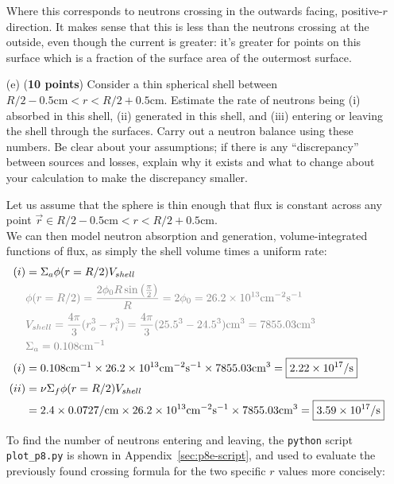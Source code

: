 \documentclass[11pt]{article}
\newcommand{\ans}[1]{{\color{violet}#1}}
\begin{document}
\begin{enumerate}
{    Where this corresponds to neutrons crossing in the outwards facing, positive-$r$ direction. It makes sense that this is less than the neutrons crossing at the outside, even though the current is greater: it's greater for points on this surface which is a fraction of the surface area of the outermost surface.
}
\item[(e)] ({\bf 10 points}) Consider a thin spherical shell between $R/2-0.5\text{cm}<r<R/2+0.5\text{cm}$. Estimate the rate of neutrons being (i) absorbed in this shell, (ii) generated in this shell, and (iii) entering or leaving the shell through the surfaces. Carry out a neutron balance using these numbers. Be clear about your assumptions; if there is any ``discrepancy'' between sources and losses, explain why it exists and what to change about your calculation to make the discrepancy smaller.
\item[] \ans{
    Let us assume that the sphere is thin enough that flux is constant across any point $\vec{r}\in R/2-0.5\text{cm}<r<R/2+0.5\text{cm}$. \\
    We can then model neutron absorption and generation, volume-integrated functions of flux, as simply the shell volume times a uniform rate:
    \begin{align*}
        (i) &= \Sigma_a \phi(r=R/2) V_{shell}\\
        &\color{gray}\phi(r=R/2) = \frac{2\phi_0R\sin{\left(\frac{\pi}{2}\right)}}{R}=2\phi_0=26.2\times10^{13}\mathrm{cm^{-2}s^{-1}}\\
        &\color{gray}V_{shell}=\frac{4\pi}{3}(r_o^3-r_i^3)=\frac{4\pi}{3}(25.5^3-24.5^3)\mathrm{cm^3}=7855.03\mathrm{cm^3}\\
        &\color{gray}\Sigma_a=0.108\mathrm{cm^{-1}}\\
        (i) &= 0.108\mathrm{cm^{-1}}\times 26.2\times10^{13}\mathrm{cm^{-2}s^{-1}} \times 7855.03\mathrm{cm^3}=\boxed{2.22\times10^{17}/\mathrm{s}}\\
        (ii) &= \nu\Sigma_f\phi(r=R/2)V_{shell}\\&=2.4\times0.0727/\mathrm{cm}\times26.2\times10^{13}\mathrm{cm^{-2}s^{-1}} \times 7855.03\mathrm{cm^3}=\boxed{3.59\times10^{17}/\mathrm{s}}\\
    \end{align*}

    To find the number of neutrons entering and leaving, the \texttt{python} script \texttt{plot\_p8.py} is shown in Appendix~\ref{sec:p8e-script}, and used to evaluate the previously found crossing formula for the two specific $r$ values more concisely:
    
}
\end{enumerate}
\end{document}
